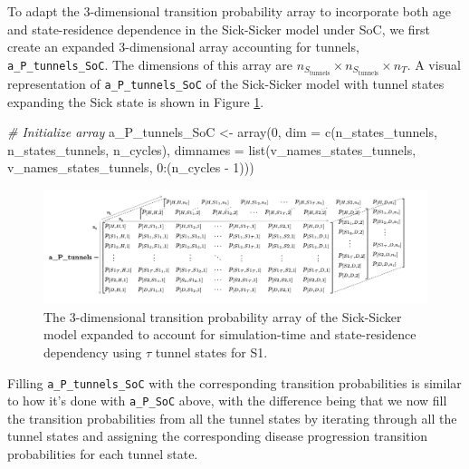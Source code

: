 \documentclass[
]{article}
\newenvironment{Shaded}{\begin{snugshade}}{\end{snugshade}}
\newcommand{\AttributeTok}[1]{\textcolor[rgb]{0.77,0.63,0.00}{#1}}
\newcommand{\CommentTok}[1]{\textcolor[rgb]{0.56,0.35,0.01}{\textit{#1}}}
\newcommand{\DecValTok}[1]{\textcolor[rgb]{0.00,0.00,0.81}{#1}}
\newcommand{\FunctionTok}[1]{\textcolor[rgb]{0.00,0.00,0.00}{#1}}
\newcommand{\NormalTok}[1]{#1}
\newcommand{\OtherTok}[1]{\textcolor[rgb]{0.56,0.35,0.01}{#1}}
\newcommand{\SpecialCharTok}[1]{\textcolor[rgb]{0.00,0.00,0.00}{#1}}
\begin{document}
To adapt the 3-dimensional transition probability array to incorporate both age and state-residence dependence in the Sick-Sicker model under SoC, we first create an expanded 3-dimensional array accounting for tunnels, \texttt{a\_P\_tunnels\_SoC}. The dimensions of this array are \(n_{S_{\text{tunnels}}} \times n_{S_{\text{tunnels}}} \times n_T\). A visual representation of \texttt{a\_P\_tunnels\_SoC} of the Sick-Sicker model with tunnel states expanding the Sick state is shown in Figure \ref{fig:Array-Time-Dependent-Tunnels}.

\begin{Shaded}
\begin{Highlighting}[]
\CommentTok{\# Initialize array}
\NormalTok{a\_P\_tunnels\_SoC }\OtherTok{\textless{}{-}} \FunctionTok{array}\NormalTok{(}\DecValTok{0}\NormalTok{, }\AttributeTok{dim =} \FunctionTok{c}\NormalTok{(n\_states\_tunnels, n\_states\_tunnels, n\_cycles),}
                         \AttributeTok{dimnames =} \FunctionTok{list}\NormalTok{(v\_names\_states\_tunnels, }
\NormalTok{                                         v\_names\_states\_tunnels, }
                                         \DecValTok{0}\SpecialCharTok{:}\NormalTok{(n\_cycles }\SpecialCharTok{{-}} \DecValTok{1}\NormalTok{)))}
\end{Highlighting}
\end{Shaded}

\begin{figure}[H]

{\centering \includegraphics[width=1\linewidth]{figs/3D-state-transition-array-sick-sicker-tunnels} 

}

\caption{The 3-dimensional transition probability array of the Sick-Sicker model expanded to account for simulation-time and state-residence dependency using $\tau$ tunnel states for S1.}\label{fig:Array-Time-Dependent-Tunnels}
\end{figure}

Filling \texttt{a\_P\_tunnels\_SoC} with the corresponding transition probabilities is similar to how it's done with \texttt{a\_P\_SoC} above, with the difference being that we now fill the transition probabilities from all the tunnel states by iterating through all the tunnel states and assigning the corresponding disease progression transition probabilities for each tunnel state.
\end{document}
